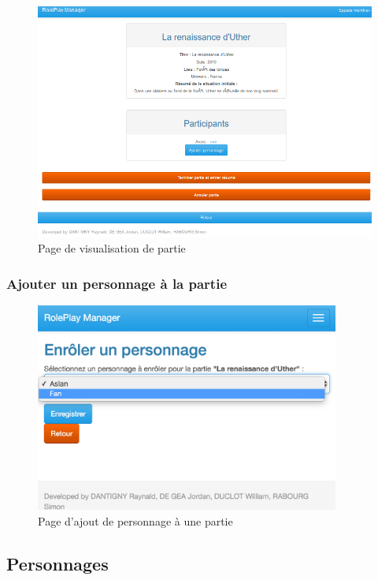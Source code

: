 \documentclass[a4paper,oneside,10pt]{article}
\begin{document}
\begin{figure}[H]
	\begin{center}
		\includegraphics[width=\textwidth]{images/manuel/voirpartie.png}  
		\caption{Page de visualisation de partie}
	\end{center}
\end{figure}

\subsubsection{Ajouter un personnage à la partie}
\label{MUAjouterPersonnagePartie}


\begin{figure}[H]
	\begin{center}
		\includegraphics[width=10cm]{images/manuel/enroll.png}  
		\caption{Page d'ajout de personnage à une partie}
	\end{center}
\end{figure}

\subsection{Personnages}
\end{document}
